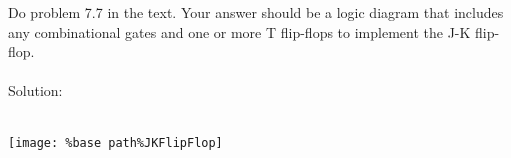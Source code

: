 Do problem 7.7 in the text.  Your answer should be a logic diagram that includes any combinational gates and one or more T flip-flops to implement the J-K flip-flop. \\ \\

Solution: \\ \\
\begin{center}
  \texttt{[image: \%base path\%JKFlipFlop]}
\end{center}
